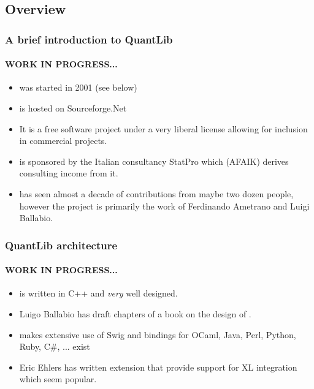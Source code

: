 \documentclass[compress]{beamer}
\begin{document}
\subsection{Overview}
\begin{frame}
  \frametitle{A brief introduction to QuantLib}
  \framesubtitle{WORK IN PROGRESS...}
  \begin{itemize}
  \item \QL was started in 2001 (see below)
  \item \QL is hosted on Sourceforge.Net
  \item It is a free software project under a very liberal license allowing
    for inclusion in commercial projects.
  \item \QL is sponsored by the Italian consultancy StatPro 
    which (AFAIK) derives consulting income from it.
  \item \QL has seen almost a decade of contributions from maybe two dozen
    people, however the project is primarily the work of Ferdinando
    Ametrano and Luigi Ballabio.
  \end{itemize}
\end{frame}

\begin{frame}
  \frametitle{QuantLib architecture}
  \framesubtitle{WORK IN PROGRESS...}
  \begin{itemize}
  \item \QL is written in C++ and \textsl{very} well designed.
  \item Luigo Ballabio has draft chapters of a book on the design of \QL.
  \item \QL makes extensive use of Swig and bindings for OCaml, Java, Perl,
    Python, Ruby, C\#, ... exist
  \item Eric Ehlers has written extension that provide support for XL
    integration which seem popular.
  \end{itemize}
\end{frame}
\end{document}

